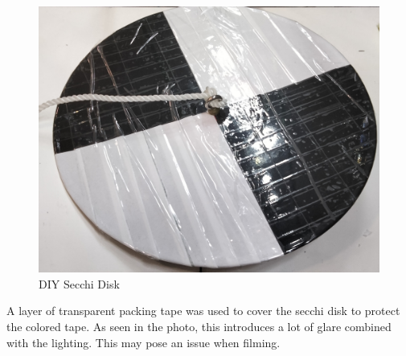 \begin{figure}[h]
\centering
\includegraphics[scale=0.1]{070_design/package/54_secchi.jpg}
\caption{DIY Secchi Disk}
\end{figure}

A layer of transparent packing tape was used to cover the secchi disk to protect the colored tape. As seen in the photo, this introduces a lot of glare combined with the lighting. This may pose an issue when filming.